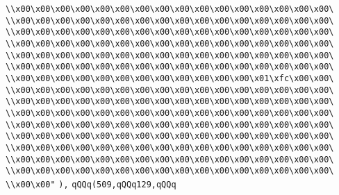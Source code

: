 \verb|\\x00\x00\x00\x00\x00\x00\x00\x00\x00\x00\x00\x00\x00\x00\x00\x00\|\newline
\verb|\\x00\x00\x00\x00\x00\x00\x00\x00\x00\x00\x00\x00\x00\x00\x00\x00\|\newline
\verb|\\x00\x00\x00\x00\x00\x00\x00\x00\x00\x00\x00\x00\x00\x00\x00\x00\|\newline
\verb|\\x00\x00\x00\x00\x00\x00\x00\x00\x00\x00\x00\x00\x00\x00\x00\x00\|\newline
\verb|\\x00\x00\x00\x00\x00\x00\x00\x00\x00\x00\x00\x00\x00\x00\x00\x00\|\newline
\verb|\\x00\x00\x00\x00\x00\x00\x00\x00\x00\x00\x00\x00\x00\x00\x00\x00\|\newline
\verb|\\x00\x00\x00\x00\x00\x00\x00\x00\x00\x00\x00\x00\x01\xfc\x00\x00\|\newline
\verb|\\x00\x00\x00\x00\x00\x00\x00\x00\x00\x00\x00\x00\x00\x00\x00\x00\|\newline
\verb|\\x00\x00\x00\x00\x00\x00\x00\x00\x00\x00\x00\x00\x00\x00\x00\x00\|\newline
\verb|\\x00\x00\x00\x00\x00\x00\x00\x00\x00\x00\x00\x00\x00\x00\x00\x00\|\newline
\verb|\\x00\x00\x00\x00\x00\x00\x00\x00\x00\x00\x00\x00\x00\x00\x00\x00\|\newline
\verb|\\x00\x00\x00\x00\x00\x00\x00\x00\x00\x00\x00\x00\x00\x00\x00\x00\|\newline
\verb|\\x00\x00\x00\x00\x00\x00\x00\x00\x00\x00\x00\x00\x00\x00\x00\x00\|\newline
\verb|\\x00\x00\x00\x00\x00\x00\x00\x00\x00\x00\x00\x00\x00\x00\x00\x00\|\newline
\verb|\\x00\x00\x00\x00\x00\x00\x00\x00\x00\x00\x00\x00\x00\x00\x00\x00\|\newline
\verb|\\x00\x00"|\newline
\verb|),|\newline
\verb|qQQq(509,qQQq129,qQQq|\newline

